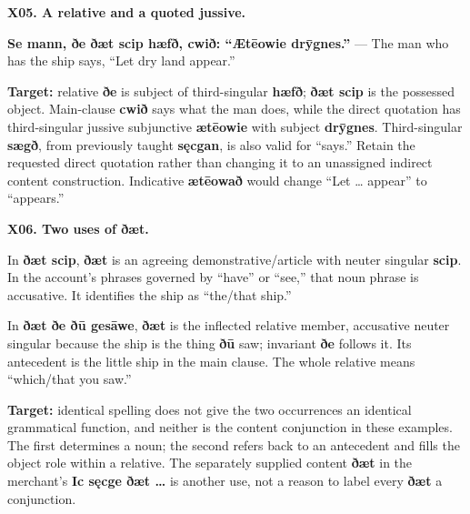 \par\begin{minipage}{\linewidth}\raggedright
\textbf{X05. A relative and a quoted jussive.}

\textbf{Se mann, ðe ðæt scip hæfð, cwið: “Ætēowie drȳgnes.”} — The man who has the ship says, “Let dry land appear.”

\textbf{Target:} relative \textbf{ðe} is subject of third-singular \textbf{hæfð}; \textbf{ðæt scip} is the possessed object. Main-clause \textbf{cwið} says what the man does, while the direct quotation has third-singular jussive subjunctive \textbf{ætēowie} with subject \textbf{drȳgnes}. Third-singular \textbf{sægð}, from previously taught \textbf{sęcgan}, is also valid for “says.” Retain the requested direct quotation rather than changing it to an unassigned indirect content construction. Indicative \textbf{ætēowað} would change “Let … appear” to “appears.”

\end{minipage}\par\addvspace{4pt}

\par\begin{minipage}{\linewidth}\raggedright
\textbf{X06. Two uses of ðæt.}

In \textbf{ðæt scip}, \textbf{ðæt} is an agreeing demonstrative/\allowbreak{}article with neuter singular \textbf{scip}. In the account's phrases governed by “have” or “see,” that noun phrase is accusative. It identifies the ship as “the/\allowbreak{}that ship.”

In \textbf{ðæt ðe ðū gesāwe}, \textbf{ðæt} is the inflected relative member, accusative neuter singular because the ship is the thing \textbf{ðū} saw; invariant \textbf{ðe} follows it. Its antecedent is the little ship in the main clause. The whole relative means “which/\allowbreak{}that you saw.”

\textbf{Target:} identical spelling does not give the two occurrences an identical grammatical function, and neither is the content conjunction in these examples. The first determines a noun; the second refers back to an antecedent and fills the object role within a relative. The separately supplied content \textbf{ðæt} in the merchant's \textbf{Ic sęcge ðæt …} is another use, not a reason to label every \textbf{ðæt} a conjunction.

\end{minipage}\par\addvspace{4pt}

